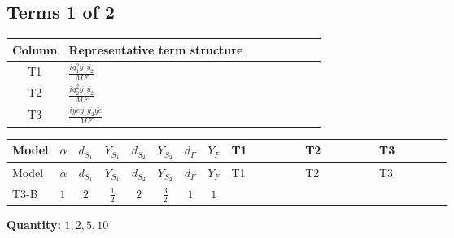 \documentclass[8pt]{article}
\begin{document}
\begin{landscape}
\subsection*{Terms 1 of 2}
\begin{center}
\begin{tabular}{@{}c >{\raggedright\arraybackslash}p{0.82\linewidth}@{}}
\toprule
Column & Representative term structure \\
\midrule
T1 & \(\displaystyle \frac{i g_{1}^{2} \overline{y_{1}} \overline{y_{2}}}{MF}\) \\
\midrule
T2 & \(\displaystyle \frac{i g_{2}^{2} \overline{y_{1}} \overline{y_{2}}}{MF}\) \\
\midrule
T3 & \(\displaystyle \frac{i ye \overline{y_{1}} \overline{y_{2}} \overline{ye}}{MF}\) \\
\midrule
\bottomrule
\end{tabular}
\end{center}
\smallskip
\tiny
\begin{longtable}{@{}llcccccc >{\raggedright\arraybackslash}p{0.21\linewidth} >{\raggedright\arraybackslash}p{0.21\linewidth} >{\raggedright\arraybackslash}p{0.21\linewidth}@{}}
\toprule
Model & $\alpha$ & $d_{S_1}$ & $Y_{S_1}$ & $d_{S_2}$ & $Y_{S_2}$ & $d_F$ & $Y_F$ & T1 & T2 & T3 \\
\midrule
\endfirsthead
\toprule
Model & $\alpha$ & $d_{S_1}$ & $Y_{S_1}$ & $d_{S_2}$ & $Y_{S_2}$ & $d_F$ & $Y_F$ & T1 & T2 & T3 \\
\midrule
\endhead
T3-B & $1$ & $2$ & $\frac{1}{2}$ & $2$ & $\frac{3}{2}$ & $1$ & $1$ & \scriptsize\adjustbox{max width=\linewidth}{$\begin{gathered} \frac{3 i g_{1}^{2} \overline{y_{1}} \overline{y_{2}}}{4 MF}\end{gathered}$} & \scriptsize\adjustbox{max width=\linewidth}{$\begin{gathered} \frac{3 i g_{2}^{2} \overline{y_{1}} \overline{y_{2}}}{8 MF}\end{gathered}$} & \scriptsize\adjustbox{max width=\linewidth}{$\begin{gathered} - \frac{i ye \overline{y_{1}} \overline{y_{2}} \overline{ye}}{8 MF}\end{gathered}$} \\
\midrule
\bottomrule
\end{longtable}
\clearpage
\noindent\textbf{Quantity: }$\mathrm{1,2,5,10}$\par\smallskip

\end{landscape}
\end{document}
